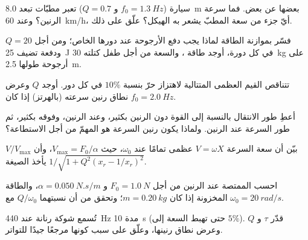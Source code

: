 \begin{exercise}[$\star\star$]\label{exo:b1:oscillators-resonance:5}
سيارة ($f_0 = \qty{1.3}{Hz}$ و $Q = 0.7$) تعبر مطبّات تبعد \qty{8.0}{m}
بعضها عن بعض. فما سرعة الرنين؟ وعند \qty{60}{km/h}، أيّ جزء من سعة
المطبّ يشعر به الهيكل؟ علّق على ذلك.
\end{exercise}

\begin{exercise}[$\star\star$]\label{exo:b1:oscillators-resonance:6}
فسّر بموازنة الطاقة لماذا يجب دفع الأرجوحة عند دورها
الخاص؛ ومن أجل $Q = 20$ ودفعة تضيف \qty{25}{J} في كل دورة، أوجد
طاقة ، والسعة من أجل طفل كتلته \qty{30}{kg} على
أرجوحة طولها \qty{2.5}{m}.
\end{exercise}

\begin{exercise}[$\star\star$]\label{exo:b1:oscillators-resonance:7}
تتناقص القيم العظمى المتتالية لاهتزاز حرّ بنسبة $10\%$ في كل دور.
أوجد $Q$ وعرض نطاق رنين سرعته (بالهرتز) إذا كان
$f_0 = \qty{2.0}{Hz}$.
\end{exercise}

\begin{exercise}[$\star\star$]\label{exo:b1:oscillators-resonance:8}
أعطِ طور الانتقال بالنسبة إلى القوة دون الرنين بكثير،
وعند الرنين، وفوقه بكثير، ثم طور السرعة
عند الرنين. ولماذا يكون رنين السرعة هو المهمّ من أجل
الاستطاعة؟
\end{exercise}

\begin{exercise}[$\star\star$]\label{exo:b1:oscillators-resonance:9}
بيّن أن سعة السرعة $V = \omega X$ عظمى تمامًا عند
$\omega_0$، حيث $V_{\max} = F_0/\alpha$، وأن $V/V_{\max}$ يأخذ
الصيغة $1/\sqrt{1 + Q^2(x_r - 1/x_r)^2}$.
\end{exercise}

\begin{exercise}[$\star\star\star$]\label{exo:b1:oscillators-resonance:10}
احسب  الممتصة عند الرنين من أجل $F_0 = \qty{1.0}{N}$ و
$\alpha = \qty{0.050}{N.s/m}$، والطاقة المخزونة إذا كان $m = \qty{0.20}{kg}$؛
وتحقق من أن نسبتهما $Q/\omega_0$ مع $\omega_0 = \qty{20}{rad/s}$.
\end{exercise}

\begin{exercise}[$\star\star\star$]\label{exo:b1:oscillators-resonance:11}
تُسمع شوكة رنانة عند \qty{440}{Hz} مدة \qty{10}{s} (حتى تهبط السعة
إلى $5\%$). قدّر $\tau$ و $Q$ وعرض نطاق رنينها، وعلّق
على سبب كونها مرجعًا جيدًا للتواتر.
\end{exercise}

